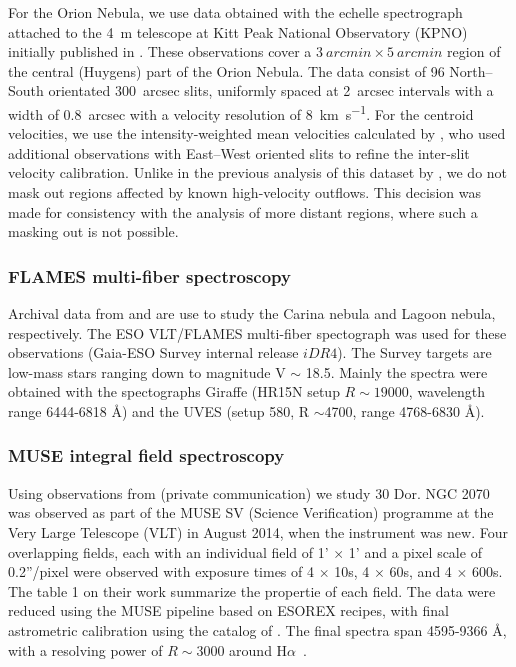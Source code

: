 \documentclass[fleqn,usenatbib, useAMS, a4paper]{mnras}
\newcommand\halpha{H${\alpha}$}
\begin{document}
For the Orion Nebula, we use data obtained with the echelle spectrograph attached to the \SI{4}{m} telescope at Kitt Peak National Observatory (KPNO) initially published in
\citet{Doi:2004a}.
These observations cover a \(\SI{3}{arcmin} \times \SI{5}{arcmin}\) region of the
central (Huygens) part of the Orion Nebula.
The data consist of 96 North--South orientated \SI{300}{arcsec} slits,
uniformly spaced at \SI{2}{arcsec} intervals with a width of \SI{0.8}{arcsec}
with a velocity resolution of \SI{8}{km.s^{-1}}. 
For the centroid velocities, we use the intensity-weighted
mean velocities calculated by \citet{Garcia-Diaz:2008a},
who used additional observations with East--West oriented slits
to refine the inter-slit velocity calibration. 
Unlike in the previous analysis of this dataset by \citet{arthur2016turbulence},
we do not mask out regions affected by known high-velocity outflows.
This decision was made for consistency with the analysis of more distant regions,
where such a masking out is not possible.

\subsubsection{FLAMES multi-fiber spectroscopy}
\label{sec:flames-multi-fiber}

Archival data from \citet{Damiani:2016a} and \citet{Damiani:2017b} are use to study the Carina nebula and Lagoon nebula, respectively. 
The ESO VLT/FLAMES multi-fiber spectograph \citep{2002Msngr.110....1P} was used for these observations (Gaia-ESO Survey internal release \(iDR4\)). 
The Survey targets are low-mass stars ranging down to magnitude V \(\sim\) 18.5.
Mainly the spectra were obtained with the spectographs Giraffe (HR15N setup \(R \sim19 000\), wavelength range 6444-6818 \AA) and the UVES (setup 580, R \(\sim\)4700, range 4768-6830 \AA).

\subsubsection{MUSE integral field spectroscopy}
\label{sec:muse-integral-field}

Using observations from \citet{Castro:2018a} (private communication) we study 30 Dor.
NGC 2070 was observed as part of the MUSE SV (Science Verification) programme at the Very Large Telescope (VLT) in August 2014, when the instrument was new. 
Four overlapping fields, each with an individual field of 1' \(\times\) 1' and a pixel scale of 0.2''/pixel were observed with exposure times of 4 \(\times\) 10s, 4 \(\times\) 60s, and 4 \(\times\) 600s. 
The table 1 on their work summarize the propertie of each field.
The data were reduced using the MUSE pipeline based on ESOREX recipes, with final astrometric calibration using the catalog of \citet{1999A&A...341...98S}. 
The final spectra span 4595-9366 \AA, with a resolving power of \(R \sim3 000\) around \halpha\  \citep{Castro:2018a}.
\end{document}
